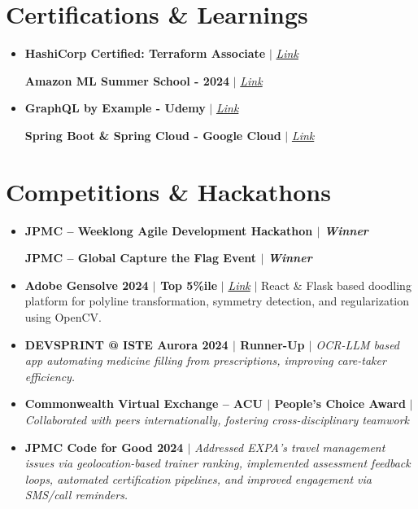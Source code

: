 \documentclass[10pt]{article}
\newcommand{\resumeCertTwoColumns}[4]{
  \item
    \begin{minipage}[t]{0.48\textwidth}
      \small #1 \hfill #2
    \end{minipage}%
      \hfill
    \begin{minipage}[t]{0.48\textwidth}
      \small #3 \hfill #4
    \end{minipage}\vspace{-8pt}
}
\newcommand{\resumeCertHeading}[1]{
    \item \small #1 \vspace{-5pt}
}
\newcommand{\resumeSubHeadingListStart}{\vspace{-1pt}\begin{itemize}[leftmargin=0.10 in, label={}]}
\newcommand{\resumeSubHeadingListEnd}{\end{itemize}}
\begin{document}
\section{Certifications \& Learnings}
\resumeSubHeadingListStart
\resumeCertTwoColumns
{\textbf{HashiCorp Certified: Terraform Associate} $|$ \footnotesize\emph{\href{https://www.credly.com/badges/8c767383-3f07-4103-881c-bd0f7b1eba3a/public_url}{Link}}}
{}
{\textbf{Amazon ML Summer School - 2024} $|$ \footnotesize\emph{\href{https://drive.google.com/file/d/1Pe39ukmHHIuC-mangq8pGkVITWgn6Cvx/view}{Link}}}
{}
\resumeCertTwoColumns
{\textbf{GraphQL by Example - Udemy} $|$ \footnotesize\emph{\href{https://www.udemy.com/certificate/UC-cdd9b580-29d9-4e68-b7d1-4f1694867a20/}{Link}}}
{}
{\textbf{Spring Boot \& Spring Cloud - Google Cloud} $|$ \footnotesize\emph{\href{https://www.coursera.org/account/accomplishments/verify/657NX5XKKVLN}{Link}}}
{}
\resumeSubHeadingListEnd
\vspace{1pt}



\section{Competitions \& Hackathons}
\resumeSubHeadingListStart

\resumeCertTwoColumns
{\textbf{JPMC – Weeklong Agile Development Hackathon $|$ \footnotesize\emph{Winner}}}{}
{\textbf{JPMC – Global Capture the Flag Event $|$ \footnotesize\emph{Winner}}}{}
\vspace{4pt}
\resumeCertHeading
{\textbf{Adobe Gensolve 2024 $|$ Top 5\%ile } $|$ \footnotesize\emph{\href{https://drive.google.com/file/d/1pWoLmEphNQBDTTapcTiruJGMoiKKBAM_/view?usp=sharing}{Link}} $|$ React \& Flask based doodling platform for polyline transformation, symmetry detection, and regularization using OpenCV. }

\resumeCertHeading
{\textbf{DEVSPRINT @ ISTE Aurora 2024 $|$ Runner-Up $|$ } \emph{  OCR-LLM based app automating medicine filling from prescriptions, improving care-taker efficiency. }}

\resumeCertHeading
{\textbf{Commonwealth Virtual Exchange – ACU $|$ People's Choice Award} $|$ \emph{Collaborated with peers internationally, fostering cross-disciplinary teamwork}}

\resumeCertHeading
{\textbf{JPMC Code for Good 2024 $|$} \emph{Addressed EXPA’s travel management issues via geolocation-based trainer ranking, implemented assessment feedback loops, automated certification pipelines, and improved engagement via SMS/call reminders.}}
\resumeSubHeadingListEnd
\end{document}

